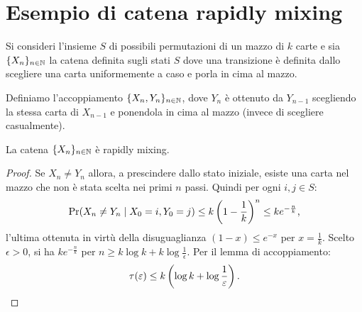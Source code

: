 \section{Esempio di catena rapidly mixing}
Si consideri l'insieme $S$ di possibili permutazioni di un mazzo di $k$ carte e sia $\chain X$ la catena definita sugli stati $S$ dove una transizione è definita dallo scegliere una carta uniformemente a caso e porla in cima al mazzo.

Definiamo l'accoppiamento $\{X_n,Y_n\}_{n\in\N}$, dove $Y_n$ è ottenuto da $Y_{n-1}$ scegliendo la stessa carta di $X_{n-1}$ e ponendola in cima al mazzo (invece di scegliere casualmente).

\begin{thm}
	La catena $\chain X$ è rapidly mixing.
\end{thm}
\begin{proof}
	Se $X_n\ne Y_n$ allora, a prescindere dallo stato iniziale, esiste una carta nel mazzo che non è stata scelta nei primi $n$ passi. Quindi per ogni $i,j\in S$:
	\begin{equation*}
		\Pr(X_n\ne Y_n\mid X_0=i,Y_0=j) \le k\left(1-\frac 1k\right)^n \le ke^{-\frac nk} \text,
	\end{equation*}
	l'ultima ottenuta in virtù della disuguaglianza $(1-x)\le e^{-x}$ per $x=\frac 1k$.
	Scelto $\epsilon>0$, si ha $ke^{-\frac nk}$ per $n\ge k\log k+k\log\frac{1}{\epsilon}$. Per il lemma di accoppiamento:
	\begin{equation*}
		\tau(\epsilon)\le k\left(\log k+\log\frac{1}{\epsilon}\right) \text. \qedhere
	\end{equation*}
\end{proof}
